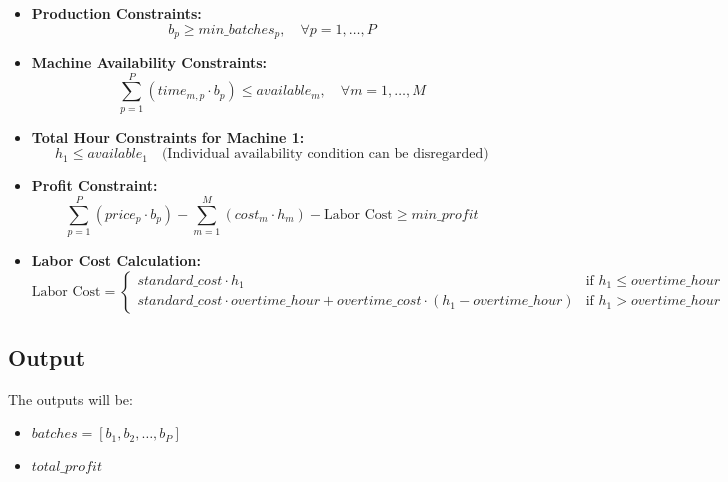 \documentclass{article}
\begin{document}
\begin{itemize}
    \item \textbf{Production Constraints:}
    \[
    b_p \geq min\_batches_p, \quad \forall p = 1, \ldots, P
    \]

    \item \textbf{Machine Availability Constraints:}
    \[
    \sum_{p=1}^{P} (time_{m,p} \cdot b_p) \leq available_m, \quad \forall m = 1, \ldots, M
    \]

    \item \textbf{Total Hour Constraints for Machine 1:}
    \[
    h_1 \leq available_1 \quad \text{(Individual availability condition can be disregarded)}
    \]

    \item \textbf{Profit Constraint:}
    \[
    \sum_{p=1}^{P} \left( price_p \cdot b_p \right) - \sum_{m=1}^{M} (cost_m \cdot h_m) - \text{Labor Cost} \geq min\_profit
    \]

    \item \textbf{Labor Cost Calculation:}
    \[
    \text{Labor Cost} = 
    \begin{cases} 
      standard\_cost \cdot h_1 & \text{if } h_1 \leq overtime\_hour \\ 
      standard\_cost \cdot overtime\_hour + overtime\_cost \cdot (h_1 - overtime\_hour) & \text{if } h_1 > overtime\_hour 
    \end{cases}
    \]

\end{itemize}

\subsection*{Output}
The outputs will be:
\begin{itemize}
    \item \( batches = [b_1, b_2, \ldots, b_P] \)
    \item \( total\_profit \)
\end{itemize}
\end{document}
